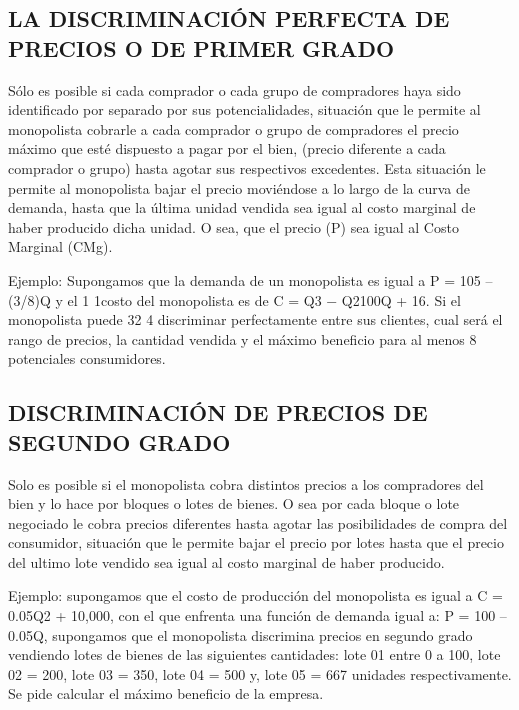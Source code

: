 \documentclass[
  letterpaper,
  DIV=11,
  numbers=noendperiod]{scrartcl}
\begin{document}
\hypertarget{la-discriminaciuxf3n-perfecta-de-precios-o-de-primer-grado}{%
\subsection{LA DISCRIMINACIÓN PERFECTA DE PRECIOS O DE PRIMER
GRADO}\label{la-discriminaciuxf3n-perfecta-de-precios-o-de-primer-grado}}

Sólo es posible si cada comprador o cada grupo de compradores haya sido
identificado por separado por sus potencialidades, situación que le
permite al monopolista cobrarle a cada comprador o grupo de compradores
el precio máximo que esté dispuesto a pagar por el bien, (precio
diferente a cada comprador o grupo) hasta agotar sus respectivos
excedentes. Esta situación le permite al monopolista bajar el precio
moviéndose a lo largo de la curva de demanda, hasta que la última unidad
vendida sea igual al costo marginal de haber producido dicha unidad. O
sea, que el precio (P) sea igual al Costo Marginal (CMg).

Ejemplo: Supongamos que la demanda de un monopolista es igual a P = 105
-- (3/8)Q y el 1 1costo del monopolista es de C = Q3 − Q2100Q + 16. Si
el monopolista puede 32 4 discriminar perfectamente entre sus clientes,
cual será el rango de precios, la cantidad vendida y el máximo beneficio
para al menos 8 potenciales consumidores.

\hypertarget{discriminaciuxf3n-de-precios-de-segundo-grado}{%
\subsection{DISCRIMINACIÓN DE PRECIOS DE SEGUNDO
GRADO}\label{discriminaciuxf3n-de-precios-de-segundo-grado}}

Solo es posible si el monopolista cobra distintos precios a los
compradores del bien y lo hace por bloques o lotes de bienes. O sea por
cada bloque o lote negociado le cobra precios diferentes hasta agotar
las posibilidades de compra del consumidor, situación que le permite
bajar el precio por lotes hasta que el precio del ultimo lote vendido
sea igual al costo marginal de haber producido.

Ejemplo: supongamos que el costo de producción del monopolista es igual
a C = 0.05Q2 + 10,000, con el que enfrenta una función de demanda igual
a: P = 100 -- 0.05Q, supongamos que el monopolista discrimina precios en
segundo grado vendiendo lotes de bienes de las siguientes cantidades:
lote 01 entre 0 a 100, lote 02 = 200, lote 03 = 350, lote 04 = 500 y,
lote 05 = 667 unidades respectivamente. Se pide calcular el máximo
beneficio de la empresa.
\end{document}
